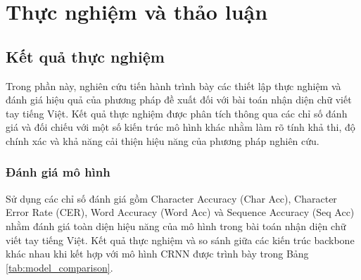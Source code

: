 \chapter{Thực nghiệm và thảo luận} %

\label{Chapter4} %


\renewcommand{\keyword}[1]{\textbf{#1}}
\renewcommand{\tabhead}[1]{\textbf{#1}}
\renewcommand{\code}[1]{\texttt{#1}}
\renewcommand{\file}[1]{\texttt{\bfseries#1}}
\renewcommand{\option}[1]{\texttt{\itshape#1}}

\section{Kết quả thực nghiệm}
Trong phần này, nghiên cứu tiến hành trình bày các thiết lập thực nghiệm và đánh giá hiệu quả của phương pháp đề xuất đối với bài toán nhận diện chữ viết tay tiếng Việt. Kết quả thực nghiệm được phân tích thông qua các chỉ số đánh giá và đối chiếu với một số kiến trúc mô hình khác nhằm làm rõ tính khả thi, độ chính xác và khả năng cải thiện hiệu năng của phương pháp nghiên cứu.

\subsection{Đánh giá mô hình}
Sử dụng các chỉ số đánh giá gồm Character Accuracy (Char Acc), Character Error Rate (CER), Word Accuracy (Word Acc) và Sequence Accuracy (Seq Acc) nhằm đánh giá toàn diện hiệu năng của mô hình trong bài toán nhận diện chữ viết tay tiếng Việt. Kết quả thực nghiệm và so sánh giữa các kiến trúc backbone khác nhau khi kết hợp với mô hình CRNN được trình bày trong Bảng \ref{tab:model_comparison}.

